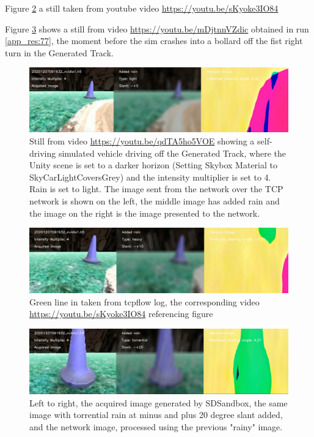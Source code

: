 Figure \ref{fig:youtube20201207091932nvidia1heavy10mult_4_h5} a still taken from youtube video \url{https://youtu.be/sKyoke3IO84}

Figure  \ref{fig:youtube20201207091932nvidia1torrential20mult_4_h5} shows a still from video \url{https://youtu.be/mDjtnnVZdic} obtained in run \ref{app_res:77}, the moment before the sim crashes into a bollard off the fist right turn in the Generated Track.

\begin{figure}[h!]
 \centering 
 \includegraphics[width=\textwidth]{Figures/youtube20201207091932nvidia1lightrainmult_4_h5.png}
 \caption{Still from video \url{https://youtu.be/qdTA5ho5VOE} showing a self-driving simulated vehicle driving off the Generated Track, where the Unity scene is set to a darker horizon (Setting Skybox Material to SkyCarLightCoversGrey) and the intensity multiplier is set to 4. Rain is set to light. The image sent from the network over the TCP network is shown on the left, the middle image has added rain and the image on the right is the image presented to the network.}
 \label{fig:youtube20201207091932nvidia1lightrainmult_4_h5} 
\end{figure}

\begin{figure}[h!]
 \centering 
 \includegraphics[width=\textwidth]{Figures/youtube20201207091932nvidia1heavy10mult_4_h5.png}
 \caption{Green line in taken from tcpflow log, the corresponding video \url{https://youtu.be/sKyoke3IO84} referencing figure }
 \label{fig:youtube20201207091932nvidia1heavy10mult_4_h5} 
\end{figure}

\begin{figure}[h!]
 \centering 
 \includegraphics[width=\textwidth]{Figures/youtube20201207091932nvidia1torrential20mult_4_h5.png}
 \caption{Left to right, the acquired image generated by SDSandbox, the same image with torrential rain at minus and plus 20 degree slant added, and the network image, processed using the previous "rainy" image.}
 \label{fig:youtube20201207091932nvidia1torrential20mult_4_h5} 
\end{figure}



